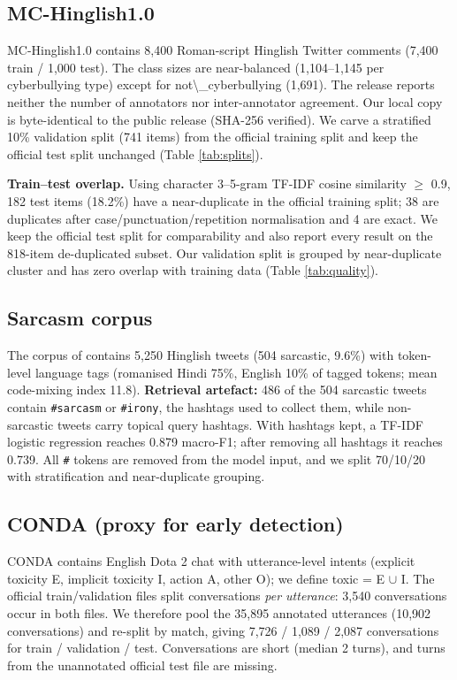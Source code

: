 \documentclass[10pt,twocolumn]{article}
\begin{document}
\subsection{MC-Hinglish1.0}

MC-Hinglish1.0 \cite{laskar2024mchinglish} contains 8,400 Roman-script Hinglish Twitter comments (7,400 train /
1,000 test). The class sizes are near-balanced (1,104--1,145 per cyberbullying type) except for not\textbackslash{}\_cyberbullying
(1,691). The release reports neither the number of annotators nor inter-annotator agreement. Our local copy is
byte-identical to the public release (SHA-256 verified). We carve a stratified 10\% validation split (741 items) from
the official training split and keep the official test split unchanged (Table \ref{tab:splits}).

\textbf{Train--test overlap.} Using character 3--5-gram TF-IDF cosine similarity $\geq$ 0.9, 182 test items
(18.2\%) have a near-duplicate in the official training split; 38 are duplicates after case/punctuation/repetition
normalisation and 4 are exact. We keep the official test split for comparability and also report every result on the
818-item de-duplicated subset. Our validation split is grouped by near-duplicate cluster and has zero
overlap with training data (Table \ref{tab:quality}).

\subsection{Sarcasm corpus}

The corpus of \citet{swami2018sarcasm} contains 5,250 Hinglish tweets (504 sarcastic, 9.6\%) with token-level language
tags (romanised Hindi 75\%, English 10\% of tagged tokens; mean code-mixing index 11.8). \textbf{Retrieval artefact:} 486 of
the 504 sarcastic tweets contain \texttt{\#sarcasm} or \texttt{\#irony}, the hashtags used to collect them, while non-sarcastic tweets
carry topical query hashtags. With hashtags kept, a TF-IDF logistic regression reaches 0.879 macro-F1; after removing all
hashtags it reaches 0.739. All \texttt{\#} tokens are removed from the model input, and we split 70/10/20 with stratification
and near-duplicate grouping.

\subsection{CONDA (proxy for early detection)}

CONDA \cite{weld2021conda} contains English Dota 2 chat with utterance-level intents (explicit toxicity E, implicit
toxicity I, action A, other O); we define toxic = E $\cup$ I. The official train/validation files split conversations
\emph{per utterance}: 3,540 conversations occur in both files. We therefore pool the 35,895 annotated utterances (10,902
conversations) and re-split by match, giving 7,726 / 1,089 / 2,087 conversations for train / validation / test.
Conversations are short (median 2 turns), and turns from the unannotated official test file are missing.
\end{document}
